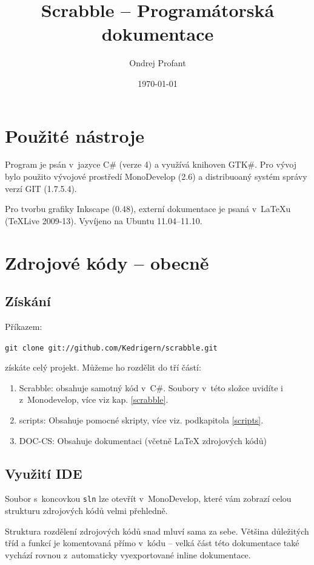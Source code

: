 \documentclass[a4paper]{article}
\title{Scrabble -- Programátorská dokumentace}
\author{Ondrej Profant}
\date{\today}
\begin{document}
\pagestyle{headings}

\maketitle

\tableofcontents	

\newpage

\section{Použité nástroje}
Program je psán v~jazyce C\# (verze 4) a využívá knihoven GTK\#. 
Pro vývoj bylo použito vývojové prostředí MonoDevelop (2.6) a distribuoaný systém správy verzí GIT (1.7.5.4).

Pro tvorbu grafiky Inkscape (0.48), externí dokumentace je psaná v~\LaTeX{u} (TeXLive 2009-13). Vyvíjeno na Ubuntu 11.04--11.10.



\section{Zdrojové kódy -- obecně}
\subsection{Získání}
Příkazem:

\texttt{git clone git://github.com/Kedrigern/scrabble.git} 

\noindent
získáte celý projekt. Můžeme ho rozdělit do tří částí:
\begin{enumerate}
\item Scrabble: obsahuje samotný kód v~C\#. Soubory v~této složce uvidíte i z~Monodevelop, více viz kap. \ref{scrabble}.
\item scripts: Obsahuje pomocné skripty, více viz. podkapitola \ref{scripts}.
\item DOC-CS: Obsahuje dokumentaci (včetně \LaTeX{} zdrojových kódů)
\end{enumerate}

\subsection{Využití IDE}
Soubor s~koncovkou \texttt{sln} lze otevřít v~MonoDevelop, které vám zobrazí celou strukturu zdrojových kódů velmi přehledně.

Struktura rozdělení zdrojových kódů snad mluví sama za sebe. Většina důležitých tříd a funkcí je komentovaná přímo v~kódu -- velká část této dokumentace také vychází rovnou z~automaticky vyexportované inline dokumentace. 
\end{document}
